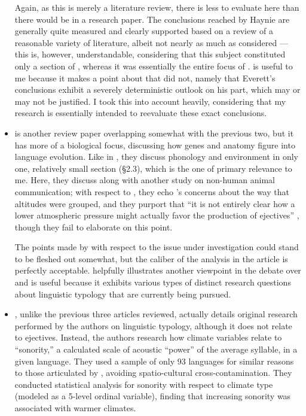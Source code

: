 \documentclass{article}
\begin{document}
\begin{itemize}
Again, as this is merely a literature review, there is less to evaluate here than there would be in a research paper. The conclusions reached by Haynie are generally quite measured and clearly supported based on a review of a reasonable variety of literature, albeit not nearly as much as \textcite{ladd2015} considered --- this is, however, understandable, considering that this subject constituted only a section of \textcite{haynie2014}, whereas it was essentially the entire focus of \textcite{ladd2015}. \textcite{haynie2014} is useful to me because it makes a point about \textcite{everett2013} that \textcite{ladd2015} did not, namely that Everett's conclusions exhibit a severely deterministic outlook on his part, which may or may not be justified. I took this into account heavily, considering that my research is essentially intended to reevaluate these exact conclusions.

\item \textbf{}

\textcite{dediu2017} is another review paper overlapping somewhat with the previous two, but it has more of a biological focus, discussing how genes and anatomy figure into language evolution. Like in \textcite{haynie2014}, they discuss phonology and environment in only one, relatively small section (\S 2.3), which is the one of primary relevance to me. Here, they discuss \textcite{everett2013,everett2015,everett2016} along with another study on non-human animal communication; with respect to \textcite{everett2013}, they echo \textcite{haynie2014}'s concerns about the way that altitudes were grouped, and they purport that ``it is not entirely clear how a lower atmospheric pressure might actually favor the production of ejectives'' \parencite[3]{dediu2017}, though they fail to elaborate on this point.

The points made by \textcite{dediu2017} with respect to the issue under investigation could stand to be fleshed out somewhat, but the caliber of the analysis in the article is perfectly acceptable. \textcite{dediu2017} helpfully illustrates another viewpoint in the debate over \textcite{everett2013} and is useful because it exhibits various types of distinct research questions about linguistic typology that are currently being pursued.

\item \textbf{}

\textcite{fought2004}, unlike the previous three articles reviewed, actually details original research performed by the authors on linguistic typology, although it does not relate to ejectives. Instead, the authors research how climate variables relate to ``sonority,'' a calculated scale of acoustic ``power'' of the average syllable, in a given language. They used a sample of only 93 languages for similar reasons to those articulated by \textcite{hammarstroem2013}, avoiding spatio-cultural cross-contamination. They conducted statistical analysis for sonority with respect to climate type (modeled as a 5-level ordinal variable), finding that increasing sonority was associated with warmer climates.


\end{itemize}
\end{document}
